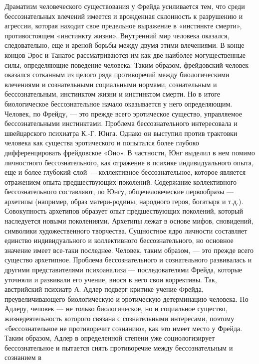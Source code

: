 \documentclass[12pt]{article}
\begin{document}
Драматизм  человеческого  существования  у  Фрейда  усиливается  тем,  что  среди  бессознательных  влечений
имеется и врожденная склонность к разрушению и агрессии, которая находит свое предельное выражение в
«инстинкте смерти», противостоящем «инстинкту жизни». Внутренний мир человека оказался, следовательно,
еще и ареной борьбы между двумя этими влечениями. В конце концов Эрос и Танатос рассматриваются им как
две наиболее могущественные силы, определяющие поведение человека.
Таким образом, фрейдовский человек оказался сотканным из целого ряда противоречий между биологическими
влечениями и сознательными социальными нормами, сознательным и бессознательным, инстинктом жизни и
инстинктом смерти. Но в итоге биологическое бессознательное начало оказывается у него определяющим.
Человек, по Фрейду, — это прежде всего эротическое существо, управляемое бессознательными инстинктами.
Проблема бессознательного интересовала и швейцарского психиатра К.-Г. Юнга. Однако он выступил против
трактовки человека как существа эротического и попытался более глубоко дифференцировать фрейдовское
«Оно». В частности, Юнг выделил в нем помимо личностного бессознательного, как отражение в психике
индивидуального  опыта,  еще  и  более  глубокий  слой  —  коллективное  бессознательное,  которое  является 
отражением опыта предшествующих поколений. Содержание коллективного бессознательного составляют, по
Юнгу, общечеловеческие первообразы — архетипы (например, образ матери-родины, народного героя, богатыря
и  т.д.).  Совокупность  архетипов  образует  опыт  предшествующих  поколений,  который  наследуется  новыми
поколениями.  Архетипы  лежат  в  основе  мифов,  сновидений,  символики  художественного  творчества.
Сущностное  ядро  личности  составляет  единство  индивидуального  и  коллективного  бессознательного,  но
основное  значение  имеет  все-таки  последнее.  Человек,  таким  образом,  —  это  прежде  всего  существо
архетипное.
Проблема  бессознательного  и  сознательного  развивалась  и  другими  представителями  психоанализа  —
последователями  Фрейда,  которые  уточняли  и  развивали  его  учение,  внося  в  него  свои  коррективы.  Так,
австрийский  психиатр  А.  Адлер  подверг  критике  учение  Фрейда,  преувеличивающего  биологическую  и
эротическую  детерминацию  человека.  По  Адлеру,  человек  —  не  только  биологическое,  но  и  социальное
существо,  жизнедеятельность  которого  связана  с  сознательными  интересами,  поэтому  «бессознательное  не
противоречит сознанию», как это имеет место у Фрейда. Таким образом, Адлер в определенной степени уже
социологизирует  бессознательное  и  пытается  снять  противоречие  между  бессознательным  и  сознанием  в
\end{document}
